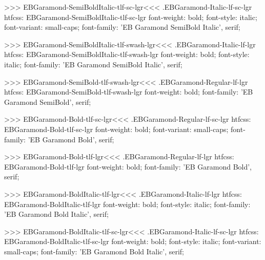 >>>
\<EBGaramond-SemiBoldItalic-tlf-sc-lgr\><<<
.EBGaramond-Italic-lf-sc-lgr
htfcss:  EBGaramond-SemiBoldItalic-tlf-sc-lgr  font-weight: bold; font-style: italic; font-variant: small-caps; font-family: 'EB Garamond SemiBold Italic', serif;

>>>
\<EBGaramond-SemiBoldItalic-tlf-swash-lgr\><<<
.EBGaramond-Italic-lf-lgr
htfcss:  EBGaramond-SemiBoldItalic-tlf-swash-lgr  font-weight: bold; font-style: italic; font-family: 'EB Garamond SemiBold Italic', serif;

>>>
\<EBGaramond-SemiBold-tlf-swash-lgr\><<<
.EBGaramond-Regular-lf-lgr
htfcss:  EBGaramond-SemiBold-tlf-swash-lgr  font-weight: bold; font-family: 'EB Garamond SemiBold', serif;

>>>
\<EBGaramond-Bold-tlf-sc-lgr\><<<
.EBGaramond-Regular-lf-sc-lgr
htfcss:  EBGaramond-Bold-tlf-sc-lgr  font-weight: bold; font-variant: small-caps; font-family: 'EB Garamond Bold', serif;

>>>
\<EBGaramond-Bold-tlf-lgr\><<<
.EBGaramond-Regular-lf-lgr
htfcss:  EBGaramond-Bold-tlf-lgr  font-weight: bold; font-family: 'EB Garamond Bold', serif;

>>>
\<EBGaramond-BoldItalic-tlf-lgr\><<<
.EBGaramond-Italic-lf-lgr
htfcss:  EBGaramond-BoldItalic-tlf-lgr  font-weight: bold; font-style: italic; font-family: 'EB Garamond Bold Italic', serif;

>>>
\<EBGaramond-BoldItalic-tlf-sc-lgr\><<<
.EBGaramond-Italic-lf-sc-lgr
htfcss:  EBGaramond-BoldItalic-tlf-sc-lgr  font-weight: bold; font-style: italic; font-variant: small-caps; font-family: 'EB Garamond Bold Italic', serif;

